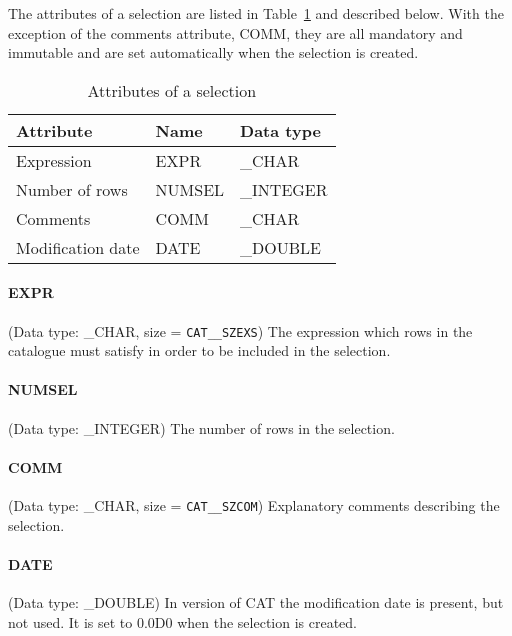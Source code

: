 The attributes of a selection are listed in Table~\ref{SELECT_ATT}
and described below. With the exception of the comments attribute,
COMM, they are all mandatory and immutable and are set automatically
when the selection is created.

\begin{table}[htbp]

\begin{center}
\begin{tabular}{lll}
Attribute         & Name    & Data type  \\ \hline
Expression        & EXPR    & \_CHAR     \\
Number of rows    & NUMSEL  & \_INTEGER  \\
Comments          & COMM    & \_CHAR     \\
Modification date & DATE    & \_DOUBLE   \\
\end{tabular}
\end{center}

\caption{\label{SELECT_ATT}Attributes of a selection}

\end{table}

\paragraph{EXPR}
(Data type: \_CHAR, size = {\tt CAT\_\_SZEXS})
The expression which rows in the catalogue must satisfy in order to be
included in the selection.

\paragraph{NUMSEL}
(Data type: \_INTEGER)
The number of rows in the selection.

\paragraph{COMM}
(Data type: \_CHAR, size = {\tt CAT\_\_SZCOM})
Explanatory comments describing the selection.

\paragraph{DATE}
(Data type: \_DOUBLE)
In version \CATversion of CAT the modification date is present, but 
not used. It is set to 0.0D0 when the selection is created.


